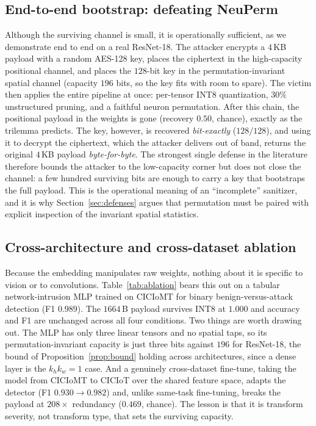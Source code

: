 \documentclass[a4paper,fleqn]{cas-dc}
\theoremstyle{plain}
\theoremstyle{remark}
\begin{document}
\subsection{End-to-end bootstrap: defeating NeuPerm}\label{sec:bootstrap}
Although the surviving channel is small, it is operationally sufficient, as we
demonstrate end to end on a real ResNet-18. The
attacker encrypts a $4$\,KB payload with a random AES-128 key, places the ciphertext in
the high-capacity positional channel, and places the $128$-bit key in the
permutation-invariant spatial channel (capacity $196$ bits, so the key fits with room to
spare). The victim then applies the entire pipeline at once: per-tensor INT8
quantization, $30\%$ unstructured pruning, and a faithful neuron permutation. After this
chain, the positional payload in the weights is gone (recovery $0.50$, chance), exactly
as the trilemma predicts. The key, however, is recovered \emph{bit-exactly}
($128/128$), and using it to decrypt the ciphertext, which the attacker delivers out of
band, returns the original $4$\,KB payload \emph{byte-for-byte}. The strongest single
defense in the literature therefore bounds the attacker to the low-capacity corner but
does not close the channel: a few hundred surviving bits are enough to carry a key that
bootstraps the full payload. This is the operational meaning of an ``incomplete''
sanitizer, and it is why Section~\ref{sec:defenses} argues that permutation must be
paired with explicit inspection of the invariant spatial statistics.

\subsection{Cross-architecture and cross-dataset ablation}\label{sec:ablation}
Because the embedding manipulates raw weights, nothing about it is specific to vision
or to convolutions. Table~\ref{tab:ablation} bears this out on a tabular
network-intrusion MLP trained on CICIoMT \citep{dadkhah2024ciciomt2024} for binary
benign-versus-attack detection (F1 $0.989$). The $1664$\,B payload survives INT8 at
$1.000$ and accuracy and F1 are unchanged across all four conditions. Two things are
worth drawing out. The MLP has only three linear tensors and no spatial taps, so its
permutation-invariant capacity is just three bits against $196$ for ResNet-18, the
bound of Proposition~\ref{prop:bound} holding across architectures, since a dense layer
is the $k_h k_w=1$ case. And a genuinely cross-dataset fine-tune, taking the model from
CICIoMT to CICIoT \citep{neto2023ciciot2023} over the shared feature space, adapts the
detector (F1 $0.930\!\to\!0.982$) and, unlike same-task fine-tuning, breaks the payload
at $208\times$ redundancy ($0.469$, chance). The lesson is that it is transform
severity, not transform type, that sets the surviving capacity.
\end{document}
